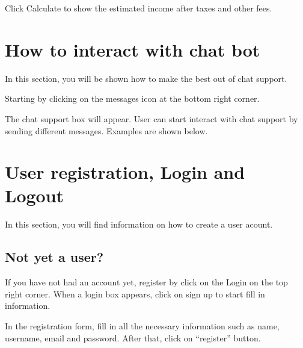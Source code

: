 \documentclass[letterpaper,10pt,english]{sphinxmanual}
\begin{document}
\sphinxAtStartPar
Click Calculate to show the estimated income after taxes and other fees.

\noindent{}

\sphinxstepscope


\chapter{How to interact with chat bot}
\label{\detokenize{pages/chatbot:how-to-interact-with-chat-bot}}\label{\detokenize{pages/chatbot::doc}}
\sphinxAtStartPar
In this section, you will be shown how to make the best out of chat support.

\sphinxAtStartPar
Starting by clicking on the messages icon at the bottom right corner.

\noindent{}

\sphinxAtStartPar
The chat support box will appear. User can start interact with chat support by sending different messages.
Examples are shown below.

\noindent{}

\noindent{}

\sphinxstepscope


\chapter{User registration, Login and Logout}
\label{\detokenize{pages/user-registration:user-registration-login-and-logout}}\label{\detokenize{pages/user-registration::doc}}
\sphinxAtStartPar
In this section, you will find information on how to create a user acount.


\section{Not yet a user?}
\label{\detokenize{pages/user-registration:not-yet-a-user}}
\sphinxAtStartPar
If you have not had an account yet, register by click on the Login on the top right corner.
When a login box appears, click on sign up to start fill in information.

\noindent{}

\sphinxAtStartPar
In the registration form, fill in all the necessary information such as name, username, email and password. After that, click on “register” button.
\end{document}
